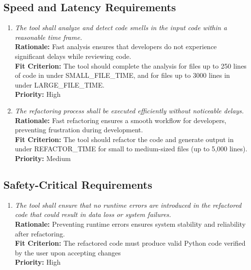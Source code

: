 \documentclass[12pt]{article}
\begin{document}
\subsection{Speed and Latency Requirements}
\begin{enumerate}[label=PR-SL \arabic*., wide=0pt, leftmargin=*]
  \item \emph{The tool shall analyze and detect code smells in the
    input code within a reasonable time frame.}\\[2mm]
    {\bf Rationale:} Fast analysis ensures that developers do not
    experience significant delays while reviewing code.\\
    {\bf Fit Criterion:} The tool should complete the analysis for
    files up to 250 lines of code in under SMALL\_FILE\_TIME, and
    for files up to 3000 lines in under LARGE\_FILE\_TIME.\\
    {\bf Priority:} High
  \item \emph{The refactoring process shall be executed efficiently
    without noticeable delays.}\\[2mm]
    {\bf Rationale:} Fast refactoring ensures a smooth workflow for
    developers, preventing frustration during development.\\
    {\bf Fit Criterion:} The tool should refactor the code and
    generate output in under REFACTOR\_TIME for small to medium-sized
    files (up to 5,000 lines).\\
    {\bf Priority:} Medium
\end{enumerate}
\subsection{Safety-Critical Requirements}
\begin{enumerate}[label=PR-SCR \arabic*., wide=0pt, leftmargin=*]
  \item \emph{The tool shall ensure that no runtime errors are
      introduced in the refactored code that could result in data loss
    or system failures.}\\[2mm]
    {\bf Rationale:} Preventing runtime errors ensures system
    stability and reliability after refactoring.\\
    {\bf Fit Criterion:} The refactored code must produce valid Python code verified by the user upon accepting changes\\
    {\bf Priority:} High
\end{enumerate}
\end{document}
